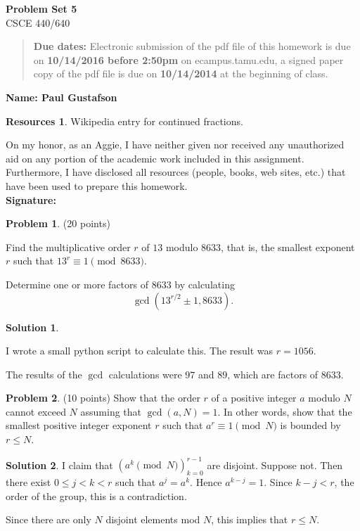 \documentclass{article}
\theoremstyle{definition}
\newtheorem{problem}{Problem}
\newtheorem*{solution}{Solution}
\newtheorem*{resources}{Resources}
\newcommand{\name}[1]{\noindent\textbf{Name: #1}}
\newcommand{\honor}{\noindent On my honor, as an Aggie, I have neither
  given nor received any unauthorized aid on any portion of the
  academic work included in this assignment. Furthermore, I have
  disclosed all resources (people, books, web sites, etc.) that have
  been used to prepare this homework. \\[1ex]
 \textbf{Signature:} \underline{\hspace*{5cm}} }
\newcommand{\problemset}[1]{\begin{center}\textbf{Problem Set #1}\\ 
CSCE 440/640\end{center}}
\newcommand{\duedate}[2]{\begin{quote}\textbf{Due dates:} Electronic
    submission of the pdf file of this homework is due on \textbf{#1} on ecampus.tamu.edu, a signed paper copy
    of the pdf file is due on \textbf{#2} at the beginning of
    class. \end{quote} }
\begin{document}
\problemset{5}
\duedate{10/14/2016 before 2:50pm}{10/14/2014}
\name{ Paul Gustafson }
\begin{resources} 
Wikipedia entry for continued fractions.
\end{resources}
\honor

\newpage

\noindent 
\begin{problem} (20 points) 
\begin{compactenum}[(a)]  
\item Find the multiplicative order $r$ of $13$ modulo $8633$, that is, the smallest exponent $r$ such that $13^r\equiv 1\pmod{8633}$.
\item Determine one or more factors of $8633$ by calculating 
$$ \gcd(13^{r/2}\pm 1, 8633).$$
\end{compactenum}
\end{problem}
\begin{solution}
\begin{compactenum}[(a)]  
\item I wrote a small python script to calculate this.  The result was $r = 1056$.
\item The results of the $\gcd$ calculations were $97$ and $89$, which are factors of $8633$.
\end{compactenum}
\end{solution}

\begin{problem} (10 points) 
Show that the order $r$ of a positive integer $a$ modulo $N$ cannot exceed $N$ assuming that $\gcd(a,N)=1$. In other words, show that the smallest positive integer exponent $r$ such that $a^r\equiv 1 \pmod N$ is bounded by $r\le N$. 
\end{problem}
\begin{solution}
I claim that $(a^k \pmod{N})_{k=0}^{r-1}$ are disjoint.  Suppose not. Then there exist $0 \le j< k < r$ such that $a^j = a^k$.  Hence $a^{k-j} = 1$.  Since $k - j < r$, the order of the group, this is a contradiction.

Since there are only $N$ disjoint elements mod $N$, this implies that $r \le N$.
\end{solution}
\end{document}

